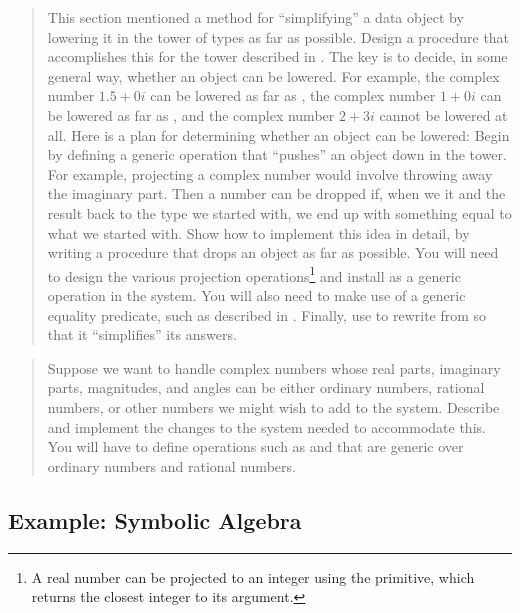 \begin{quote}
 This section mentioned a method
for ``simplifying'' a data object by lowering it in the tower of types as far
as possible.  Design a procedure  that accomplishes this for the
tower described in .  The key is to decide, in some general
way, whether an object can be lowered.  For example, the complex number
\( 1.5 + 0i \) can be lowered as far as , the complex number \( 1 + 0i \) can
be lowered as far as , and the complex number \( 2 + 3i \) cannot
be lowered at all.  Here is a plan for determining whether an object can be
lowered: Begin by defining a generic operation  that ``pushes''
an object down in the tower.  For example, projecting a complex number would
involve throwing away the imaginary part.  Then a number can be dropped if,
when we  it and  the result back to the type we
started with, we end up with something equal to what we started with.  Show how
to implement this idea in detail, by writing a  procedure that drops
an object as far as possible.  You will need to design the various projection
operations\footnote{A real number can be projected to an integer using the
 primitive, which returns the closest integer to its argument.} and
install  as a generic operation in the system.  You will also
need to make use of a generic equality predicate, such as described in
.  Finally, use  to rewrite 
from  so that it ``simplifies'' its answers.
\end{quote}

\begin{quote}
 Suppose we want to handle complex
numbers whose real parts, imaginary parts, magnitudes, and angles can be either
ordinary numbers, rational numbers, or other numbers we might wish to add to
the system.  Describe and implement the changes to the system needed to
accommodate this.  You will have to define operations such as  and
 that are generic over ordinary numbers and rational numbers.
\end{quote}

\subsection{Example: Symbolic Algebra}
\label{Section 2.5.3}

